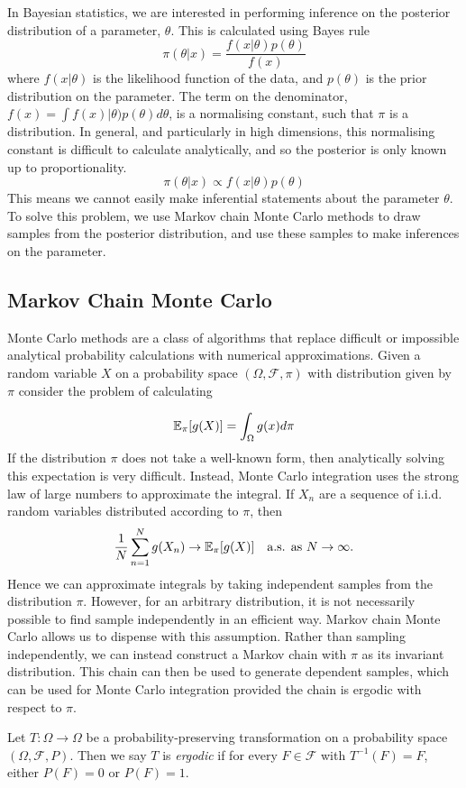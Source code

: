 In Bayesian statistics, we are interested in performing inference on the posterior distribution of a parameter, $\theta$.  This is calculated using Bayes rule
$$
\pi(\theta | x) = \frac{f(x | \theta) p(\theta)}{f(x)}
$$
where $f(x|\theta)$ is the likelihood function of the data, and $p(\theta)$ is the prior distribution on the parameter.  The term on the denominator, $f(x)=\int f(x)|\theta) p(\theta) d\theta$, is a normalising constant, such that $\pi$ is a distribution.  In general, and particularly in high dimensions, this normalising constant is difficult to calculate analytically, and so the posterior is only known up to proportionality.
$$
\pi(\theta | x) \propto f(x | \theta) p(\theta)
$$
This means we cannot easily make inferential statements about the parameter $\theta$.  To solve this problem, we use Markov chain Monte Carlo methods to draw samples from the posterior distribution, and use these samples to make inferences on the parameter.

\subsection{Markov Chain Monte Carlo}
Monte Carlo methods are a class of algorithms that replace difficult or impossible analytical probability calculations with numerical approximations.  Given a random variable $X$ on a probability space $(\Omega,\mathcal{F}, \pi)$ with distribution given by $\pi$ consider the problem of calculating

$$
\mathbb{E}_\pi[g(X)] = \int_\Omega g(x) d \pi
$$
If the distribution $\pi$ does not take a well-known form, then analytically solving this expectation is very difficult.  Instead, Monte Carlo integration uses the strong law of large numbers to approximate the integral.  If $X_n$ are a sequence of i.i.d. random variables distributed according to $\pi$, then
$$
\frac{1}{N} \sum_{n=1}^N g(X_n) \to \mathbb{E}_\pi[g(X)] \quad \text{a.s. as $N \to \infty$.}
$$
Hence we can approximate integrals by taking independent samples from the distribution $\pi$.  However, for an arbitrary distribution, it is not necessarily possible to find sample independently in an efficient way.  Markov chain Monte Carlo allows us to dispense with this assumption.  Rather than sampling independently, we can instead construct a Markov chain with $\pi$ as its invariant distribution.  This chain can then be used to generate dependent samples, which can be used for Monte Carlo integration provided the chain is ergodic with respect to $\pi$.

\begin{defn}[Ergodicity]
Let $T:\Omega \to \Omega$ be a probability-preserving transformation on a probability space $(\Omega,\mathcal{F}, P)$.  Then we say $T$ is \emph{ergodic} if for every $F \in \mathcal{F}$ with $T^{-1}(F)=F$, either $P(F)=0$ or $P(F)=1$.
\end{defn}


